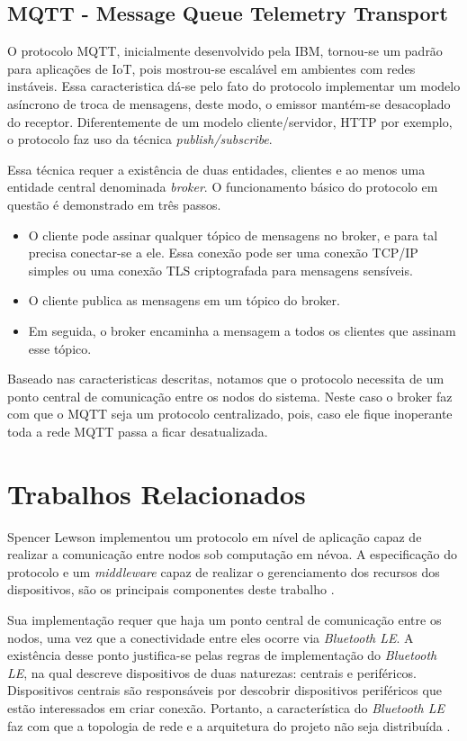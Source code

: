 \subsection{MQTT - Message Queue Telemetry Transport}

O protocolo MQTT, inicialmente desenvolvido pela IBM, tornou-se um padrão para aplicações de IoT, pois mostrou-se escalável em ambientes com redes instáveis.
Essa caracteristica dá-se pelo fato do protocolo implementar um modelo asíncrono de troca de mensagens, deste modo, o emissor mantém-se desacoplado do receptor.
Diferentemente de um modelo cliente/servidor, HTTP por exemplo, o protocolo faz uso da técnica \textit{publish/subscribe}.


Essa técnica requer a existência de duas entidades, clientes e ao menos uma entidade central denominada \textit{broker}.
O funcionamento básico do protocolo em questão é demonstrado em três passos.

\begin{itemize}
    \item O cliente pode assinar qualquer tópico de mensagens no broker, e para tal precisa conectar-se a ele. Essa conexão pode ser uma conexão TCP/IP simples ou uma conexão TLS criptografada para mensagens sensíveis.
    \item O cliente publica as mensagens em um tópico do broker.
    \item Em seguida, o broker encaminha a mensagem a todos os clientes que assinam esse tópico.
\end{itemize}

Baseado nas caracteristicas descritas, notamos que o protocolo necessita de um ponto central de comunicação entre os nodos do sistema.
Neste caso o broker faz com que o MQTT seja um protocolo centralizado, pois, caso ele fique inoperante toda a rede MQTT passa a ficar desatualizada.

\section{Trabalhos Relacionados}

Spencer Lewson implementou um protocolo em nível de aplicação \cite{tanenbaum2011redes} capaz de realizar a comunicação entre nodos sob computação em névoa.
A especificação do protocolo e um \textit{middleware} capaz de realizar o gerenciamento dos recursos dos dispositivos, são os principais componentes deste trabalho \cite{Spencer:2015}.

Sua implementação requer que haja um ponto central de comunicação entre os nodos, uma vez que a conectividade entre eles ocorre via \textit{Bluetooth LE}.
A existência desse ponto justifica-se pelas regras de implementação do \textit{Bluetooth LE}, na qual descreve dispositivos de duas naturezas: centrais e periféricos.
Dispositivos centrais são responsáveis por descobrir dispositivos periféricos que estão interessados em criar conexão.
Portanto, a característica do \textit{Bluetooth LE} faz com que a topologia de rede e a arquitetura do projeto não seja distribuída \cite{Spencer:2015}.

